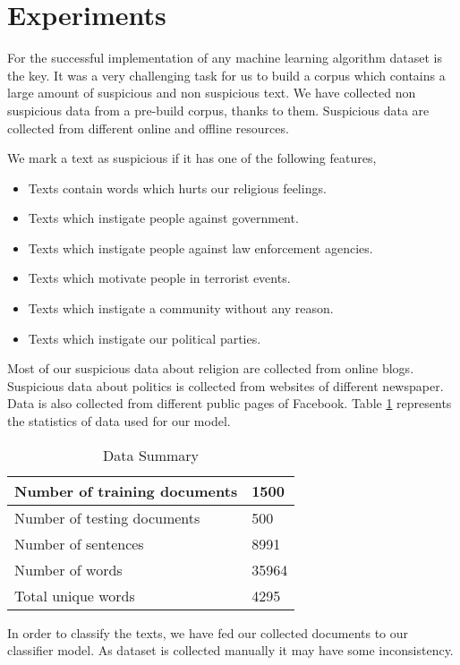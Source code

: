 \section{\textbf{Experiments}}
For the successful implementation of any machine learning algorithm dataset is the key. It was a very challenging task for us to build a corpus which contains a large amount of suspicious and non suspicious text. We have collected non suspicious data from a pre-build corpus\cite{banglacorpus}, thanks to them. Suspicious data are collected from different online and offline resources.%
\par \vspace{0.3cm} 
We mark a text as suspicious if it has one of the following features,
\begin{itemize}
    \item Texts contain words which hurts our religious feelings.\vspace{0.2cm} 
    \item Texts which instigate people against government.\vspace{0.2cm} 
    \item Texts which instigate people against law enforcement agencies.\vspace{0.2cm} 
    \item Texts which motivate people in terrorist events.\vspace{0.2cm} 
    \item Texts which instigate a community without any reason.\vspace{0.2cm} 
    \item Texts which instigate our political parties. 
\end{itemize}
 \par \vspace{0.3cm}
 Most of our suspicious data about religion are collected from online blogs\cite{nastikya, dhormo, istishon}. Suspicious data about politics is collected from websites of different newspaper\cite{palo, kk, juga}. Data is also collected from different public pages of Facebook\cite{bash}. Table \ref{data} represents the statistics of data used for our model.
 
 \renewcommand{\arraystretch}{1.3}
\begin{table}[h!]
\begin{center}
\caption{Data Summary}
\begin{tabular}{|m{4.8cm} | m{3cm}|}
\hline
     Number of training documents & 1500 \\
\hline
     Number of testing documents & 500 \\
\hline
     Number of sentences & 8991\\
\hline 
     Number of words & 35964\\
\hline 
     Total unique words & 4295\\
\hline
\end{tabular}
\label{data}
\end{center}
\end{table}

In order to classify the texts, we have fed our collected documents to our classifier model. As dataset is collected manually it may have some inconsistency.